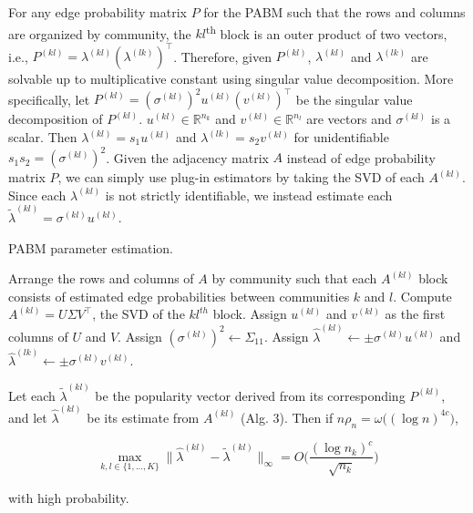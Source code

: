 \documentclass[12pt]{article}
\begin{document}
For any edge probability matrix \(P\) for the PABM such that the rows
and columns are organized by community, the \(kl\)\textsuperscript{th}
block is an outer product of two vectors, i.e.,
\(P^{(kl)} = \lambda^{(kl)} (\lambda^{(lk)})^\top\). Therefore, given
\(P^{(kl)}\), \(\lambda^{(kl)}\) and \(\lambda^{(lk)}\) are solvable
up to multiplicative constant using singular value
decomposition. More specifically, 
let \(P^{(kl)} = (\sigma^{(kl)})^2 u^{(kl)} (v^{(kl)})^\top\)
be the singular value decomposition of \(P^{(kl)}\).
\(u^{(kl)} \in \mathbb{R}^{n_k}\) and 
\(v^{(kl)} \in \mathbb{R}^{n_l}\) are vectors
and \(\sigma^{(kl)}\) is a scalar. Then \(\lambda^{(kl)} = s_1 u^{(kl)}\)
and \(\lambda^{(lk)} = s_2 v^{(kl)}\) 
for unidentifiable $s_1 s_2 = (\sigma^{(kl)})^2$.
Given the adjacency matrix \(A\)
instead of edge probability matrix \(P\), we can simply use plug-in
estimators by taking the SVD of each $A^{(kl)}$. 
Since each $\lambda^{(kl)}$ is not strictly identifiable,
we instead estimate each $\tilde{\lambda}^{(kl)} = \sigma^{(kl)} u^{(kl)}$. 

\begin{algorithm}[t]
  \DontPrintSemicolon
  \SetAlgoLined
  \caption{PABM parameter estimation.}
  Arrange the rows and columns of $A$ by community such that each 
  $A^{(kl)}$ block consists of estimated edge probabilities between 
  communities $k$ and $l$.\;
   {
    Compute $A^{(kl)} = U \Sigma V^\top$, the SVD of the $kl^{th}$ 
    block.\;
    Assign $u^{(kl)}$ and $v^{(kl)}$ as the first columns of $U$ and $V$. 
    Assign $(\sigma^{(kl)})^2 \leftarrow \Sigma_{11}$.\;
    Assign $\hat{\lambda}^{(kl)} \leftarrow \pm \sigma^{(kl)} u^{(kl)}$ and 
    $\hat{\lambda}^{(lk)} \leftarrow \pm \sigma^{(kl)} v^{(kl)}$.
  }
\end{algorithm}

\begin{theorem}
\label{theorem6}
Let each $\tilde{\lambda}^{(kl)}$ be the popularity vector derived from its corresponding $P^{(kl)}$, and let $\hat{\lambda}^{(kl)}$ be its estimate from $A^{(kl)}$ (Alg. 3). Then if $n \rho_n = \omega \big( (\log n)^{4 c} \big)$,

\begin{equation} \label{eq:thm6}
\max_{k, l \in \{1, ..., K\}} 
\|\hat{\lambda}^{(kl)} - \tilde{\lambda}^{(kl)}\|_{\infty} = 
O\bigg(\frac{(\log n_k)^c}{\sqrt{n_k}} \bigg)
\end{equation}

with high probability.
\end{theorem}
\end{document}
